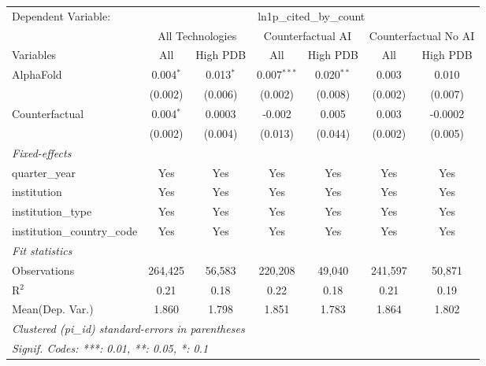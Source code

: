 \begingroup
\centering
\begin{tabular}{lcccccc}
   \tabularnewline \midrule \midrule
   Dependent Variable: & \multicolumn{6}{c}{ln1p\_cited\_by\_count}\\
 & \multicolumn{2}{c}{All Technologies} & \multicolumn{2}{c}{Counterfactual AI} & \multicolumn{2}{c}{Counterfactual No AI} \\
\cmidrule(lr){1-1}\cmidrule(lr){2-3} \cmidrule(lr){4-5} \cmidrule(lr){6-7}
Variables & \multicolumn{1}{c}{All} & \multicolumn{1}{c}{High PDB} & \multicolumn{1}{c}{All} & \multicolumn{1}{c}{High PDB} & \multicolumn{1}{c}{All} & \multicolumn{1}{c}{High PDB} \\
\cmidrule(lr){1-1}\cmidrule(lr){2-2} \cmidrule(lr){3-3} \cmidrule(lr){4-4} \cmidrule(lr){5-5} \cmidrule(lr){6-6} \cmidrule(lr){7-7}
   AlphaFold                    & 0.004$^{*}$ & 0.013$^{*}$ & 0.007$^{***}$ & 0.020$^{**}$ & 0.003   & 0.010\\   
                                & (0.002)     & (0.006)     & (0.002)       & (0.008)      & (0.002) & (0.007)\\   
   Counterfactual               & 0.004$^{*}$ & 0.0003      & -0.002        & 0.005        & 0.003   & -0.0002\\   
                                & (0.002)     & (0.004)     & (0.013)       & (0.044)      & (0.002) & (0.005)\\   
   \midrule
   \emph{Fixed-effects}\\
   quarter\_year                & Yes         & Yes         & Yes           & Yes          & Yes     & Yes\\  
   institution                  & Yes         & Yes         & Yes           & Yes          & Yes     & Yes\\  
   institution\_type            & Yes         & Yes         & Yes           & Yes          & Yes     & Yes\\  
   institution\_country\_code   & Yes         & Yes         & Yes           & Yes          & Yes     & Yes\\  
   \midrule
   \emph{Fit statistics}\\
   Observations                 & 264,425     & 56,583      & 220,208       & 49,040       & 241,597 & 50,871\\  
   R$^2$                        & 0.21        & 0.18        & 0.22          & 0.18         & 0.21    & 0.19\\  
Mean(Dep. Var.) & 1.860 & 1.798 & 1.851 & 1.783 & 1.864 & 1.802 \\
   \midrule \midrule
   \multicolumn{7}{l}{\emph{Clustered (pi\_id) standard-errors in parentheses}}\\
   \multicolumn{7}{l}{\emph{Signif. Codes: ***: 0.01, **: 0.05, *: 0.1}}\\
\end{tabular}
\par\endgroup
